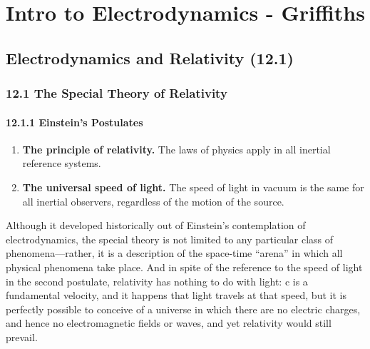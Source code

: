 \documentclass[11pt,letterpaper]{book}
\begin{document}
\chapter{Intro to Electrodynamics - Griffiths}

\section{Electrodynamics and Relativity (12.1)}

\subsection{12.1 The Special Theory of Relativity}

    \subsubsection{12.1.1 Einstein’s Postulates}
            \begin{enumerate}
                \item \textbf{The principle of relativity.} The laws of physics apply in all inertial reference systems.
                \item \textbf{The universal speed of light.} The speed of light in vacuum is the same for all inertial observers, regardless of the motion of the source.
            \end{enumerate}
     Although it developed historically out of Einstein’s contemplation of electrodynamics, the special theory is not limited to any particular class of phenomena—rather, it is a description of the space-time “arena” in which all physical phenomena take place. And in spite of the reference to the speed of light
    in the second postulate, relativity has nothing to do with light: c is a fundamental velocity, and it happens that light travels at that speed, but it is perfectly possible to conceive of a universe in which there are no electric charges, and hence no electromagnetic fields or waves, and yet relativity would still prevail.
    
\end{document}
